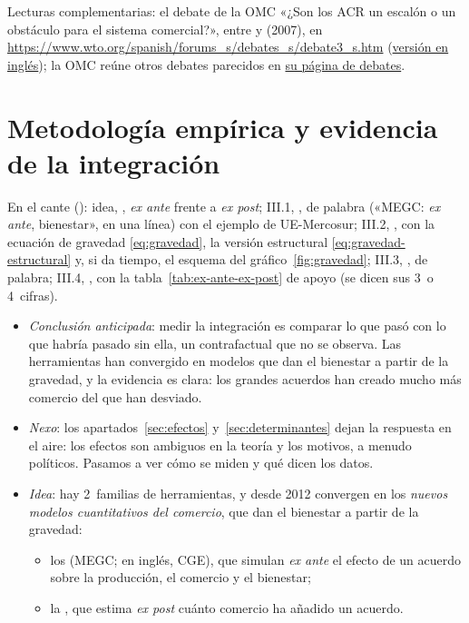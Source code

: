\documentclass[11pt]{article}
\begin{document}
\begin{anotaciones}
Lecturas complementarias: el debate de la OMC «¿Son los ACR un escalón o un obstáculo para el sistema comercial?», entre  y  (2007)\nocite{OMCDebateACR}, en \url{https://www.wto.org/spanish/forums_s/debates_s/debate3_s.htm} (\href{https://www.wto.org/english/forums_e/debates_e/debate3_e.htm}{versión en inglés}); la OMC reúne otros debates parecidos en \href{https://www.wto.org/spanish/forums_s/debates_s/debates_s.htm}{su página de debates}.
\end{anotaciones}

\section{Metodología empírica y evidencia de la integración}\label{sec:medicion}

\begin{notaopositor}
En el cante (): idea, , \emph{ex ante} frente a \emph{ex post}; III.1, , de palabra («MEGC: \emph{ex ante}, bienestar», en una línea) con el ejemplo de UE-Mercosur; III.2, , con la ecuación de gravedad \eqref{eq:gravedad}, la versión estructural \eqref{eq:gravedad-estructural} y, si da tiempo, el esquema del gráfico~\ref{fig:gravedad}; III.3, , de palabra; III.4, , con la tabla~\ref{tab:ex-ante-ex-post} de apoyo (se dicen sus 3~o 4~cifras).
\end{notaopositor}

\begin{itemize}
\item \emph{Conclusión anticipada}: medir la integración es comparar lo que pasó con lo que habría pasado sin ella, un contrafactual que no se observa. Las herramientas han convergido en modelos que dan el bienestar a partir de la gravedad, y la evidencia es clara: los grandes acuerdos han creado mucho más comercio del que han desviado.
\item \emph{Nexo}: los apartados~\ref{sec:efectos} y~\ref{sec:determinantes} dejan la respuesta en el aire: los efectos son ambiguos en la teoría y los motivos, a menudo políticos. Pasamos a ver cómo se miden y qué dicen los datos.
\item \emph{Idea}: hay 2~familias de herramientas, y desde 2012 convergen en los \emph{nuevos modelos cuantitativos del comercio}, que dan el bienestar a partir de la gravedad\nocite{ArkolakisCostinotRodriguezClare2012New}:
  \begin{itemize}
  \item los  (MEGC; en inglés, CGE), que simulan \emph{ex ante} el efecto de un acuerdo sobre la producción, el comercio y el bienestar;
  \item la , que estima \emph{ex post} cuánto comercio ha añadido un acuerdo.
  \end{itemize}
\end{itemize}
\end{document}
